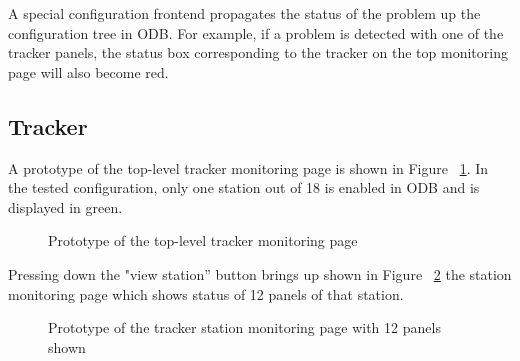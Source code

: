 A special configuration frontend propagates the status of the problem up the
configuration tree in ODB. For example, if a problem is detected with one of the
tracker panels, the status box corresponding to the tracker on the top monitoring
page will also become red.

\subsection{Tracker}

A prototype of the top-level tracker monitoring page is shown
in Figure ~\ref{figure:monitoring_tracker_view}.
In the tested configuration, only one station out of 18 is enabled in ODB
and is displayed in green.

\begin{figure}[H]
  \caption{
    \label{figure:monitoring_tracker_view}
    Prototype of the top-level tracker monitoring page
  }
\end{figure}

Pressing down the "view station'' button brings up shown in Figure ~\ref{figure:monitoring_station_view}
the station monitoring page which shows status of 12 panels of that station.

\begin{figure}[H]
  \caption{
    \label{figure:monitoring_station_view}
    Prototype of the tracker station monitoring page with 12 panels shown
  }
\end{figure}

